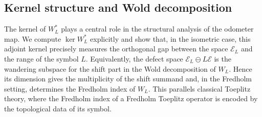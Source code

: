 \documentclass[12pt]{amsart}
\theoremstyle{definition}
\theoremstyle{remark}
\newcommand{\cle}{\mathcal{E}}
\numberwithin{equation}{section}
\begin{document}
\subsection{Kernel structure and Wold decomposition}\label{sec:Kernel}
The kernel of $W_L^*$ plays a central role in the structural analysis of the odometer map. We compute $\ker W_L^*$ explicitly and show that, in the isometric case, this adjoint kernel precisely measures the orthogonal gap between the space $\cle_L$ and the range of the symbol $L$.
Equivalently, the defect space \(\cle_L\ominus L\cle\) is the wandering
subspace for the shift part in the Wold decomposition of \(W_L\). Hence its
dimension gives the multiplicity of the shift summand and, in the
Fredholm setting, determines the Fredholm index of \(W_L\). This parallels classical Toeplitz theory, where the Fredholm index of a
Fredholm Toeplitz operator is encoded by the topological data of its symbol.
\end{document}
